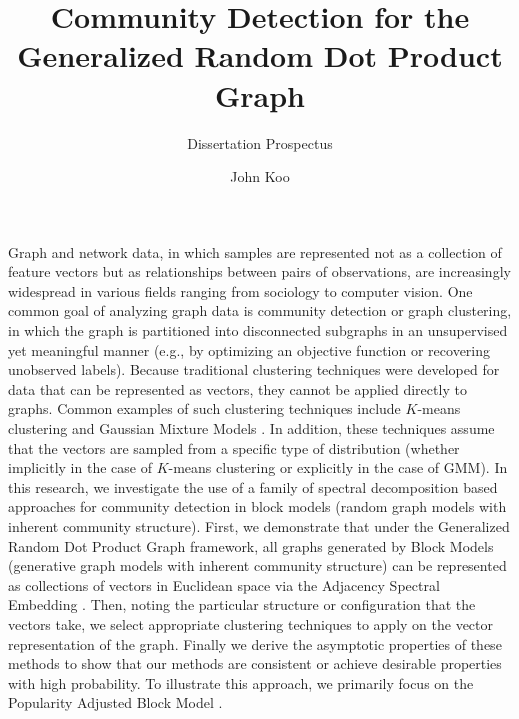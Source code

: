 \documentclass[
  11pt,
]{article}
\title{Community Detection for the\\
Generalized Random Dot Product Graph}
\subtitle{Dissertation Prospectus}
\author{John Koo}
\date{}
\begin{document}
\maketitle

\newcommand{\diag}{\text{diag}}
\newcommand{\tr}{\text{Tr}}
\newcommand{\blockdiag}{\text{blockdiag}}
\newcommand{\indep}{\stackrel{\text{ind}}{\sim}}
\newcommand{\iid}{\stackrel{\text{iid}}{\sim}}
\newcommand{\Bernoulli}{\text{Bernoulli}}
\newcommand{\Betadist}{\text{Beta}}
\newcommand{\BG}{\text{BernoulliGraph}}
\newcommand{\Cat}{\text{Categorical}}
\newcommand{\GRDPG}{\text{GRDPG}}
\newtheorem{definition}{Definition}
\newtheorem{theorem}{Theorem}
\newtheorem{lemma}{Lemma}
\theoremstyle{remark}
\newtheorem*{remark}{Remark}
\theoremstyle{example}
\newtheorem*{example}{Example}

Graph and network data, in which samples are represented not as a
collection of feature vectors but as relationships between pairs of
observations, are increasingly widespread in various fields ranging from
sociology to computer vision. One common goal of analyzing graph data is
community detection or graph clustering, in which the graph is
partitioned into disconnected subgraphs in an unsupervised yet
meaningful manner (e.g., by optimizing an objective function or
recovering unobserved labels). Because traditional clustering techniques
were developed for data that can be represented as vectors, they cannot
be applied directly to graphs. Common examples of such clustering
techniques include \(K\)-means clustering \cite{1056489} and Gaussian
Mixture Models \cite{doi:10.1198/016214502760047131}. In addition, these
techniques assume that the vectors are sampled from a specific type of
distribution (whether implicitly in the case of \(K\)-means clustering
or explicitly in the case of GMM). In this research, we investigate the
use of a family of spectral decomposition based approaches for community
detection in block models (random graph models with inherent community
structure). First, we demonstrate that under the Generalized Random Dot
Product Graph \cite{rubindelanchy2017statistical} framework, all graphs
generated by Block Models (generative graph models with inherent
community structure) can be represented as collections of vectors in
Euclidean space via the Adjacency Spectral Embedding
\cite{athreya2017statistical, lyzinski2014}. Then, noting the particular
structure or configuration that the vectors take, we select appropriate
clustering techniques to apply on the vector representation of the
graph. Finally we derive the asymptotic properties of these methods to
show that our methods are consistent or achieve desirable properties
with high probability. To illustrate this approach, we primarily focus
on the Popularity Adjusted Block Model
\cite{307cbeb9b1be48299388437423d94bf1}.
\end{document}
